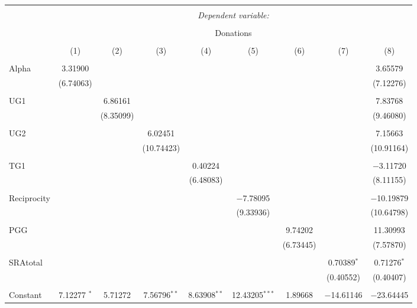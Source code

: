 \documentclass[12pt]{article}
\begin{document}
\begin{table}[!htbp] \centering 
  \caption{} 
  \label{} 
          \begin{adjustbox}{width=\textwidth}
\begin{tabular}{@{\extracolsep{5pt}}lcccccccc} 
\\[-1.8ex]\hline 
\hline \\[-1.8ex] 
 & \multicolumn{8}{c}{\textit{Dependent variable:}} \\ 
\cline{2-9} 
\\[-1.8ex] & \multicolumn{8}{c}{Donations} \\ 
\\[-1.8ex] & (1) & (2) & (3) & (4) & (5) & (6) & (7) & (8)\\ 
\hline \\[-1.8ex] 
 Alpha & 3.31900 &  &  &  &  &  &  & 3.65579 \\ 
  & (6.74063) &  &  &  &  &  &  & (7.12276) \\ 
  & & & & & & & & \\ 
 UG1 &  & 6.86161 &  &  &  &  &  & 7.83768 \\ 
  &  & (8.35099) &  &  &  &  &  & (9.46080) \\ 
  & & & & & & & & \\ 
 UG2 &  &  & 6.02451 &  &  &  &  & 7.15663 \\ 
  &  &  & (10.74423) &  &  &  &  & (10.91164) \\ 
  & & & & & & & & \\ 
 TG1 &  &  &  & 0.40224 &  &  &  & $-$3.11720 \\ 
  &  &  &  & (6.48083) &  &  &  & (8.11155) \\ 
  & & & & & & & & \\ 
 Reciprocity &  &  &  &  & $-$7.78095 &  &  & $-$10.19879 \\ 
  &  &  &  &  & (9.33936) &  &  & (10.64798) \\ 
  & & & & & & & & \\ 
 PGG &  &  &  &  &  & 9.74202 &  & 11.30993 \\ 
  &  &  &  &  &  & (6.73445) &  & (7.57870) \\ 
  & & & & & & & & \\ 
 SRAtotal &  &  &  &  &  &  & 0.70389$^{*}$ & 0.71276$^{*}$ \\ 
  &  &  &  &  &  &  & (0.40552) & (0.40407) \\ 
  & & & & & & & & \\ 
 Constant & 7.12277 $^{*}$ & 5.71272 & 7.56796$^{**}$ & 8.63908$^{**}$ & 12.43205$^{***}$ & 1.89668 & $-$14.61146 & $-$23.64445 \\ 

\end{tabular}
\end{adjustbox}
\end{table}
\end{document}
